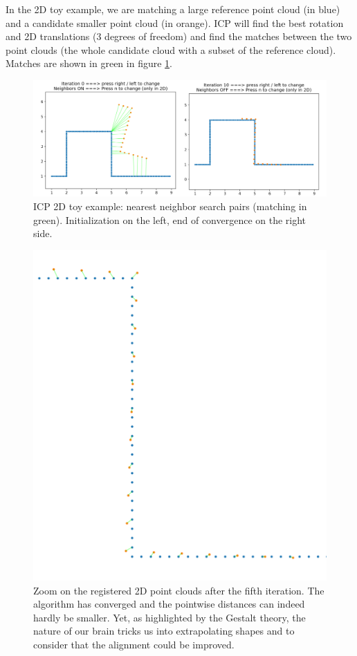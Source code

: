 \documentclass[a4paper]{article}
\begin{document}
In the 2D toy example, we are matching a large reference point cloud (in blue) and a candidate smaller point cloud (in orange). 
ICP will find the best rotation and 2D translations (3 degrees of freedom) and find the matches between the two point clouds (the whole candidate cloud with a subset of the reference cloud).
Matches are shown in green in figure \ref{fig:icp_toy}.

\begin{figure}[ht]
  \centering
  \includegraphics[width=0.8\linewidth]{figures/icp_convergence.png}
  \caption{ICP 2D toy example: nearest neighbor search pairs (matching in green). Initialization on the left, end of convergence on the right side.}
  \label{fig:icp_toy}
\end{figure}

\begin{figure}[ht]
  \centering
  \includegraphics[width=0.4\linewidth]{figures/icp_2d_toy_example_zoom.png}
  \caption{Zoom on the registered 2D point clouds after the fifth iteration. The algorithm has converged and the pointwise distances can indeed hardly be smaller. Yet, as highlighted by the Gestalt theory, the nature of our brain tricks us into extrapolating shapes and to consider that the alignment could be improved.}
  \label{fig:icp_toy_convergence_zoom}
\end{figure}

\pagebreak
\end{document}
